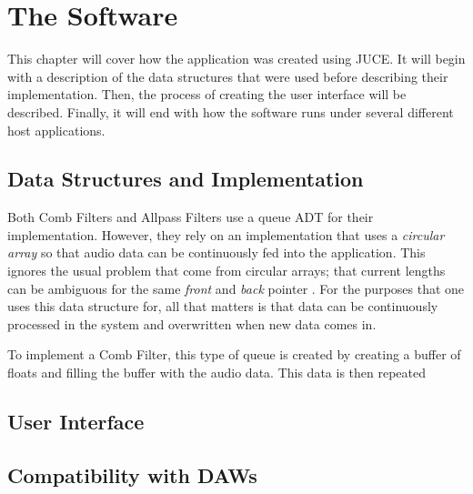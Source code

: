 \chapter{The Software}
\hspace*{-0.15cm}This chapter will cover how the application was created using JUCE. It will begin with a description of the data structures that were used before describing their implementation. Then, the process of creating the user interface will be described. Finally, it will end with how the software runs under several different host applications.
\section{Data Structures and Implementation}
Both Comb Filters and Allpass Filters use a queue ADT for their implementation. However, they rely on an implementation that uses a \textit{circular array} so that audio data can be continuously fed into the application. This ignores the usual problem that come from circular arrays; that current lengths can be ambiguous for the same \textit{front} and \textit{back} pointer \cite{carrano2016data}. For the purposes that one uses this data structure for, all that matters is that data can be continuously processed in the system and overwritten when new data comes in.

To implement a Comb Filter, this type of queue is created by creating a buffer of floats and filling the buffer with the audio data. This data is then repeated

\lstset{language =[ANSI]C++}
\lstset{linewidth=.95\textwidth,breaklines=true}
\lstset{commentstyle=\textit,stringstyle=\upshape,showspaces=false}
\lstset{frame = single}
\lstset{numbers=left,numberstyle=\tiny,basicstyle=\small}
\lstset{commentstyle=\normalfont\itshape,breakautoindent=true}
\lstset{abovecaptionskip=1.2\baselineskip,xleftmargin=30pt}
\lstset{framesep=6pt}

\section{User Interface}

\section{Compatibility with DAWs}
